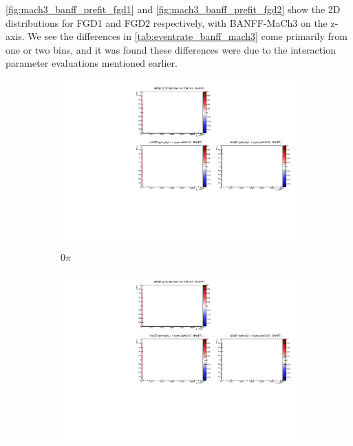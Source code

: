 \autoref{fig:mach3_banff_prefit_fgd1} and \autoref{fig:mach3_banff_prefit_fgd2} show the 2D \pmu \cosmu distributions for FGD1 and FGD2 respectively, with BANFF-MaCh3 on the z-axis. We see the differences in \autoref{tab:eventrate_banff_mach3} come primarily from one or two bins, and it was found these differences were due to the interaction parameter evaluations mentioned earlier.
\begin{figure}[h]
	\begin{subfigure}[t]{0.32\textwidth}
		\includegraphics[width=\textwidth, trim={5mm 70mm 100mm 7mm}, clip, page=1]{figures/mach3/banff/momentumProjections_170328_withMACH3_MAQEonly}
		\caption{0$\pi$}
	\end{subfigure}
	\begin{subfigure}[t]{0.32\textwidth}
		\includegraphics[width=\textwidth, trim={5mm 70mm 100mm 7mm}, clip, page=2]{figures/mach3/banff/momentumProjections_170328_withMACH3_MAQEonly}

\end{subfigure}
\end{figure}
